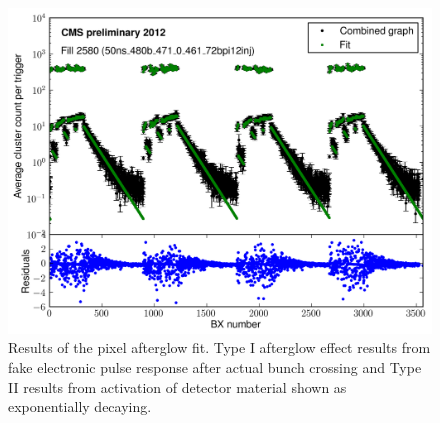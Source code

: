 \begin{figure}[H]
  \centering
  \includegraphics[width=0.5\columnwidth]{./afterglow.png}
  \caption{Results of the pixel afterglow fit. Type I afterglow effect results from fake electronic pulse response after actual bunch crossing and Type II results from activation of detector material shown as exponentially decaying. }
  \label{fig:LHC}
\end{figure}




\clearpage\newpage
